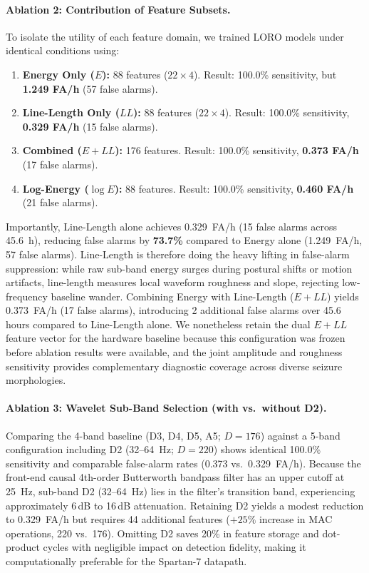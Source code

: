 \documentclass[10pt,twocolumn,letterpaper]{article}
\begin{document}
{\paragraph{Ablation 2: Contribution of Feature Subsets.}
To isolate the utility of each feature domain, we trained LORO models under identical conditions using:
\begin{enumerate}
    \item \textbf{Energy Only ($E$):} 88 features ($22 \times 4$). Result: 100.0\% sensitivity, but \textbf{1.249 FA/h} (57 false alarms).
    \item \textbf{Line-Length Only ($LL$):} 88 features ($22 \times 4$). Result: 100.0\% sensitivity, \textbf{0.329 FA/h} (15 false alarms).
    \item \textbf{Combined ($E + LL$):} 176 features. Result: 100.0\% sensitivity, \textbf{0.373 FA/h} (17 false alarms).
    \item \textbf{Log-Energy ($\log E$):} 88 features. Result: 100.0\% sensitivity, \textbf{0.460 FA/h} (21 false alarms).
\end{enumerate}
Importantly, Line-Length alone achieves 0.329~FA/h (15 false alarms across 45.6~h), reducing false alarms by \textbf{73.7\%} compared to Energy alone (1.249~FA/h, 57 false alarms). Line-Length is therefore doing the heavy lifting in false-alarm suppression: while raw sub-band energy surges during postural shifts or motion artifacts, line-length measures local waveform roughness and slope, rejecting low-frequency baseline wander. Combining Energy with Line-Length ($E+LL$) yields 0.373~FA/h (17 false alarms), introducing 2 additional false alarms over 45.6 hours compared to Line-Length alone. We nonetheless retain the dual $E+LL$ feature vector for the hardware baseline because this configuration was frozen before ablation results were available, and the joint amplitude and roughness sensitivity provides complementary diagnostic coverage across diverse seizure morphologies.

\paragraph{Ablation 3: Wavelet Sub-Band Selection (with vs.\ without D2).}
Comparing the 4-band baseline (D3, D4, D5, A5; $D=176$) against a 5-band configuration including D2 (32--64~Hz; $D=220$) shows identical 100.0\% sensitivity and comparable false-alarm rates (0.373 vs.\ 0.329~FA/h). Because the front-end causal 4th-order Butterworth bandpass filter has an upper cutoff at 25~Hz, sub-band D2 (32--64~Hz) lies in the filter's transition band, experiencing approximately 6\,dB to 16\,dB attenuation. Retaining D2 yields a modest reduction to 0.329~FA/h but requires 44 additional features ($+25\%$ increase in MAC operations, 220 vs.\ 176). Omitting D2 saves 20\% in feature storage and dot-product cycles with negligible impact on detection fidelity, making it computationally preferable for the Spartan-7 datapath.

}
\end{document}
